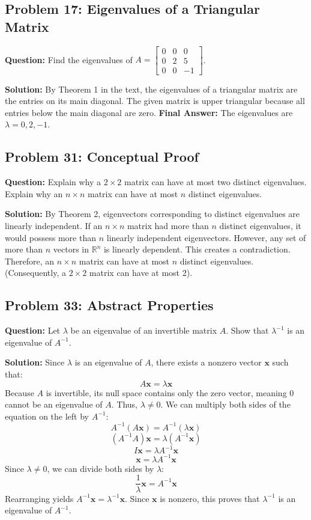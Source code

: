 \documentclass[11pt, a4paper]{article}
\theoremstyle{definition}
\theoremstyle{remark}
\newcommand{\R}{\mathbb{R}}
\begin{document}
\subsection{Problem 17: Eigenvalues of a Triangular Matrix}
\textbf{Question:} Find the eigenvalues of $A = \begin{bmatrix} 0 & 0 & 0 \\ 0 & 2 & 5 \\ 0 & 0 & -1 \end{bmatrix}$.

\textbf{Solution:}
By Theorem 1 in the text, the eigenvalues of a triangular matrix are the entries on its main diagonal. The given matrix is upper triangular because all entries below the main diagonal are zero.
\textbf{Final Answer:} The eigenvalues are $\lambda = 0, 2, -1$.

\subsection{Problem 31: Conceptual Proof}
\textbf{Question:} Explain why a $2 \times 2$ matrix can have at most two distinct eigenvalues. Explain why an $n \times n$ matrix can have at most $n$ distinct eigenvalues.

\textbf{Solution:}
By Theorem 2, eigenvectors corresponding to distinct eigenvalues are linearly independent. If an $n \times n$ matrix had more than $n$ distinct eigenvalues, it would possess more than $n$ linearly independent eigenvectors. However, any set of more than $n$ vectors in $\R^n$ is linearly dependent. This creates a contradiction. Therefore, an $n \times n$ matrix can have at most $n$ distinct eigenvalues. (Consequently, a $2 \times 2$ matrix can have at most 2).

\subsection{Problem 33: Abstract Properties}
\textbf{Question:} Let $\lambda$ be an eigenvalue of an invertible matrix $A$. Show that $\lambda^{-1}$ is an eigenvalue of $A^{-1}$.

\textbf{Solution:}
Since $\lambda$ is an eigenvalue of $A$, there exists a nonzero vector $\mathbf{x}$ such that:
\[ A\mathbf{x} = \lambda \mathbf{x} \]
Because $A$ is invertible, its null space contains only the zero vector, meaning $0$ cannot be an eigenvalue of $A$. Thus, $\lambda \neq 0$. We can multiply both sides of the equation on the left by $A^{-1}$:
\[ A^{-1}(A\mathbf{x}) = A^{-1}(\lambda \mathbf{x}) \]
\[ (A^{-1}A)\mathbf{x} = \lambda (A^{-1}\mathbf{x}) \]
\[ I\mathbf{x} = \lambda A^{-1}\mathbf{x} \]
\[ \mathbf{x} = \lambda A^{-1}\mathbf{x} \]
Since $\lambda \neq 0$, we can divide both sides by $\lambda$:
\[ \frac{1}{\lambda}\mathbf{x} = A^{-1}\mathbf{x} \]
Rearranging yields $A^{-1}\mathbf{x} = \lambda^{-1}\mathbf{x}$. Since $\mathbf{x}$ is nonzero, this proves that $\lambda^{-1}$ is an eigenvalue of $A^{-1}$.
\end{document}
